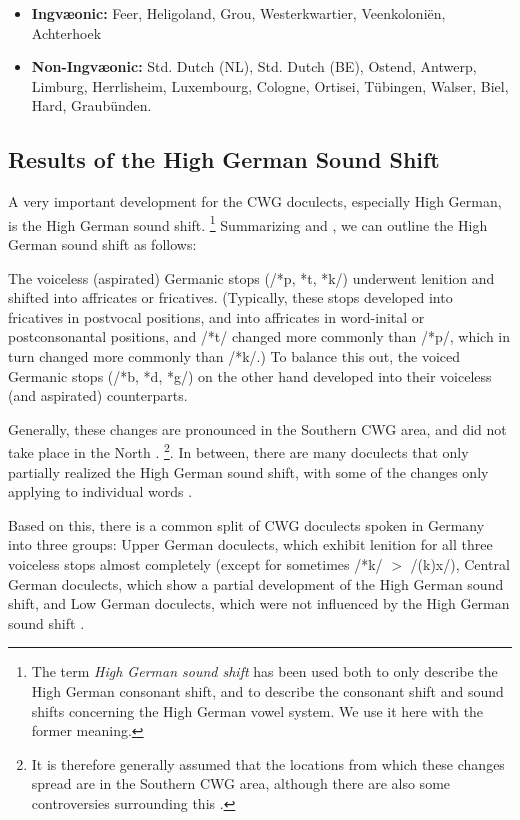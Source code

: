 \documentclass[a4paper]{article}
\begin{document}
\begin{itemize}
\item 
\textbf{Ingv\ae{}onic:}
Feer, Heligoland, Grou,
Westerkwartier, Veenkoloni\"{e}n, Achterhoek

\item
\textbf{Non-Ingv\ae{}onic:}
Std. Dutch (NL), Std. Dutch (BE), Ostend, Antwerp, Limburg,
Herrlisheim, Luxembourg, Cologne,
Ortisei, T\"{u}bingen, Walser, Biel, Hard, Graub\"{u}nden.
\end{itemize}

\subsection{Results of the High German Sound Shift}

A very important development for the CWG doculects,
especially High German, is the High German sound shift.
\footnote{
The term \textit{High German sound shift} has been used both
to only describe the High German consonant shift,
and to describe the consonant shift and sound shifts concerning
the High German vowel system.
We use it here with the former meaning.
}
Summarizing \citet[pp. 47--48]{harbert2007germanic}
and \citet[pp. 62--64]{koenig2015dtv},
we can outline the High German sound shift as follows:

The voiceless (aspirated) Germanic stops (/*p, *t, *k/)
underwent lenition and shifted into affricates or fricatives.
(Typically, these stops developed into fricatives in postvocal positions,
and into affricates in word-inital or postconsonantal positions,
and /*t/ changed more commonly than /*p/,
which in turn changed more commonly than /*k/.)
To balance this out,
the voiced Germanic stops (/*b, *d, *g/) on the other hand
developed into their voiceless (and aspirated) counterparts.

Generally, these changes are pronounced
in the Southern CWG area, and did not take place in the North
\cite[p. 33]{noble1983modern}.
\footnote{
It is therefore generally assumed that the locations
from which these changes spread are in the Southern CWG area,
although there are also some controversies surrounding this
\citep[pp. 155--181]{goblirsch2005lautverschiebungen}.
}.
In between, there are many doculects
that only partially realized the High German sound shift,
with some of the changes only applying to individual words
\citet[p. 63]{koenig2015dtv}.

Based on this, there is a common split
of CWG doculects spoken in Germany into three groups:
Upper German doculects, which exhibit lenition for
all three voiceless stops almost completely
(except for sometimes /*k/ $>$ /(k)x/),
Central German doculects, which show a
partial development of the High German sound shift,
and Low German doculects,
which were not influenced by the High German sound shift
\citep[pp. 33, 55]{noble1983modern}.
\end{document}
